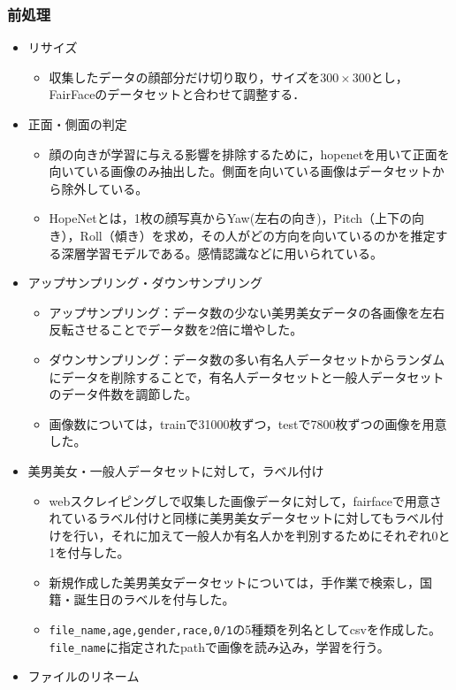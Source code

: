 \documentclass[a4paper,11pt,titlepage]{jsarticle}
\begin{document}
\subsubsection{前処理}
\begin{itemize}
    \item リサイズ
        \begin{itemize}
            \item 収集したデータの顔部分だけ切り取り，サイズを$300 \times 300$とし，FairFaceのデータセットと合わせて調整する．
        \end{itemize}
    \item 正面・側面の判定
        \begin{itemize}
            \item 顔の向きが学習に与える影響を排除するために，hopenetを用いて正面を向いている画像のみ抽出した。側面を向いている画像はデータセットから除外している。
            \item HopeNetとは，1枚の顔写真からYaw(左右の向き)，Pitch（上下の向き），Roll（傾き）を求め，その人がどの方向を向いているのかを推定する深層学習モデルである。感情認識などに用いられている。
        \end{itemize}
    \item アップサンプリング・ダウンサンプリング
        \begin{itemize}
            \item アップサンプリング：データ数の少ない美男美女データの各画像を左右反転させることでデータ数を2倍に増やした。
            \item ダウンサンプリング：データ数の多い有名人データセットからランダムにデータを削除することで，有名人データセットと一般人データセットのデータ件数を調節した。
            \item 画像数については，trainで31000枚ずつ，testで7800枚ずつの画像を用意した。
        \end{itemize}
    \item 美男美女・一般人データセットに対して，ラベル付け
        \begin{itemize}
            \item webスクレイピングしで収集した画像データに対して，fairfaceで用意されているラベル付けと同様に美男美女データセットに対してもラベル付けを行い，それに加えて一般人か有名人かを判別するためにそれぞれ0と1を付与した。
            \item 新規作成した美男美女データセットについては，手作業で検索し，国籍・誕生日のラベルを付与した。
            \item \texttt{file\_name,age,gender,race,0/1}の5種類を列名としてcsvを作成した。\texttt{file\_name}に指定されたpathで画像を読み込み，学習を行う。
        \end{itemize}
    \item ファイルのリネーム
\end{itemize}
\end{document}
